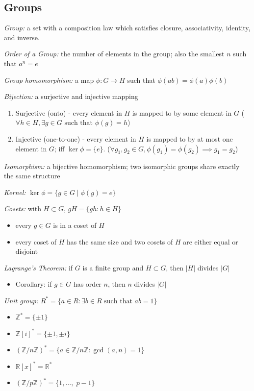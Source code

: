 \documentclass[9pt]{memoir}
\newcommand{\R}{\mathbb{R}}
\newcommand{\Z}{\mathbb{Z}}
\begin{document}
\begin{multicols}{2}
        
\section*{Groups}
    \emph{Group:} a set with a composition law which satisfies closure, associativity, identity, and inverse.

    \emph{Order of a Group:} the number of elements in the group; also the smallest $n$ such that $a^n = e$

    \emph{Group homomorphism:} a map $\phi: G \to H$ such that $\phi(ab) = \phi(a)\phi(b)$

    \emph{Bijection:} a surjective and injective mapping 
    \begin{enumerate}
        \item Surjective (onto) - every element in $H$ is mapped to by some element in $G$  ($\forall h \in H, \exists g \in G \text{ such that } \phi(g) = h$)
        \item Injective (one-to-one) - every element in $H$ is mapped to by at most one element in $G$; iff $\ker \phi = \{e\}$. ($\forall g_1, g_2 \in G, \phi(g_1) = \phi(g_2) \implies g_1 = g_2$)
    \end{enumerate}

    \emph{Isomorphism:} a bijective homomorphism; two isomorphic groups share exactly the same structure 

    \emph{Kernel:} $\ker \phi = \{g \in G \mid \phi(g) = e\}$

    \emph{Cosets:} with $H \subset G$, $gH = \{gh : h \in H\}$
    \begin{itemize}
        \item every $g \in G$ is in a coset of $H$
        \item every coset of $H$ has the same size and two cosets of $H$ are either equal or disjoint 
    \end{itemize}

    \emph{Lagrange's Theorem:} if $G$ is a finite group and $H \subset G$, then $|H|$ divides $|G|$
    \begin{itemize}
        \item Corollary: if $g \in G$ has order $n$, then $n$ divides $|G|$
    \end{itemize}

    \emph{Unit group:} $R^* = \{a \in R: \exists b\in R \text{ such that } ab = 1\}$
    \begin{itemize}
        \item $\Z^* = \{\pm 1\}$
        \item $\Z[i]^* = \{\pm 1, \pm i\}$
        \item $(\Z/n\Z)^* = \{a \in \Z/n\Z : \gcd(a, n) = 1\}$
        \item $\R[x]^* = \R^*$
        \item $(\Z/p\Z)^* = \{1, \dots,\; p -1\}$
    \end{itemize}


\end{multicols}
\end{document}
